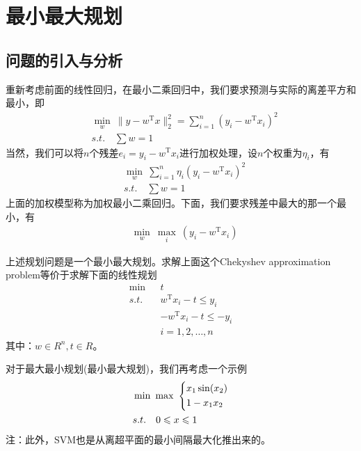 % 
\chapter{最小最大规划}

\section{问题的引入与分析}
    \par
    重新考虑前面的线性回归，在最小二乘回归中，我们要求预测与实际的离差平方和最小，即
    \begin{align*}
        &\mathop{\min}\limits_{w}\ \|y-w^\mathrm{T} x\|_2^2=\mathop{\sum}\limits_{i=1}^n(y_i-w^\mathrm{T} x_i)^2\\
        &s.t.\quad {\sum}w=1
    \end{align*}
    当然，我们可以将$n$个残差$e_i=y_i-w^\mathrm{T} x_i$进行加权处理，设$n$个权重为${\eta}_i$，有
    \begin{align*}
        &\mathop{\min}\limits_{w}\  \mathop{\sum}\limits_{i=1}^n{\eta}_i(y_i-w^\mathrm{T} x_i)^2\\
        &s.t.\quad {\sum}w=1
    \end{align*}
    上面的加权模型称为加权最小二乘回归。下面，我们要求残差中最大的那一个最小，有
    \begin{align*}
        &\mathop{\min}\limits_{w}\  \mathop{\max}\limits_{i}\ (y_i-w^\mathrm{T} x_i)
    \end{align*}
    \par
    上述规划问题是一个最小最大规划。求解上面这个Chekyshev approximation problem等价于求解下面的线性规划
    \begin{align*}
        \mathop{\min}\  &t\\
        s.t.\quad & w^\mathrm{T} x_i-t\leqslant y_i\\
        & -w^\mathrm{T} x_i-t\leqslant -y_i\\
        &i=1,2,\ldots,n
    \end{align*}
    其中：$w\in R^n,t\in R$。
    \par
    对于最大最小规划(最小最大规划)，我们再考虑一个示例
        \begin{align}
        \label{引例2}
        &\mathop {\min} \ \mathop {\max}\
        \left\{
        \begin{aligned}
        & x_1\sin(x_2)\\
        & 1-x_1x_2\\
        \end{aligned}
        \right.\\
        &s.t.\quad 0 \leqslant x \leqslant 1 \notag
        \end{align}
        注：此外，SVM也是从离超平面的最小间隔最大化推出来的。
